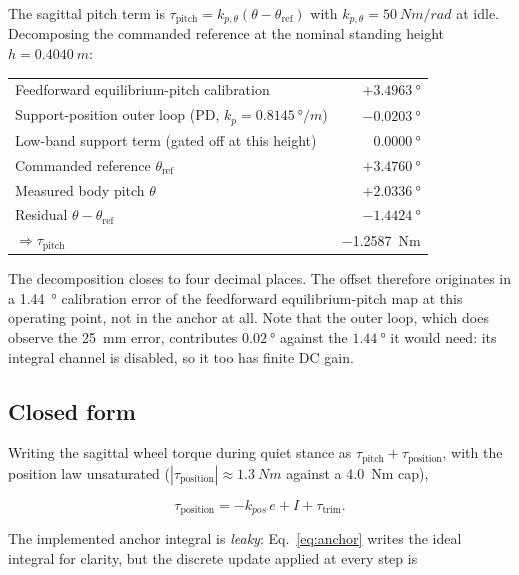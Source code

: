 \documentclass[a4paper,fleqn]{cas-dc}
\begin{document}
The sagittal pitch term is $\tau_{\text{pitch}}=k_{p,\theta}(\theta-\theta_{\text{ref}})$
with $k_{p,\theta}=\SI{50}{Nm/rad}$ at idle. Decomposing the commanded
reference at the nominal standing height $h{=}\SI{0.4040}{m}$:

\begin{center}\footnotesize
\begin{tabular}{lr}
\hline
Feedforward equilibrium-pitch calibration & $+\SI{3.4963}{\degree}$ \\
Support-position outer loop (PD, $k_p{=}\SI{0.8145}{\degree/m}$) & $-\SI{0.0203}{\degree}$ \\
Low-band support term (gated off at this height) & $\phantom{+}\SI{0.0000}{\degree}$ \\
\hline
Commanded reference $\theta_{\text{ref}}$ & $+\SI{3.4760}{\degree}$ \\
Measured body pitch $\theta$ & $+\SI{2.0336}{\degree}$ \\
\hline
Residual $\theta-\theta_{\text{ref}}$ & $-\SI{1.4424}{\degree}$ \\
$\Rightarrow \tau_{\text{pitch}}$ & \SI{-1.2587}{Nm} \\
\hline
\end{tabular}
\end{center}

The decomposition closes to four decimal places. The offset therefore
originates in a \SI{1.44}{\degree} calibration error of the feedforward
equilibrium-pitch map at this operating point, not in the anchor at all. Note
that the outer loop, which does observe the \SI{25}{mm} error, contributes
$\SI{0.02}{\degree}$ against the $\SI{1.44}{\degree}$ it would need: its
integral channel is disabled, so it too has finite DC gain.

\subsection{Closed form}

Writing the sagittal wheel torque during quiet stance as
$\tau_{\text{pitch}}+\tau_{\text{position}}$, with the position law unsaturated
($|\tau_{\text{position}}|\approx\SI{1.3}{Nm}$ against a \SI{4.0}{Nm} cap),

\begin{equation}
\tau_{\text{position}} = -k_{pos}\,e + I + \tau_{\text{trim}}.
\label{eq:poslaw}
\end{equation}

The implemented anchor integral is \emph{leaky}: Eq.~\eqref{eq:anchor} writes
the ideal integral for clarity, but the discrete update applied at every step is
\end{document}
